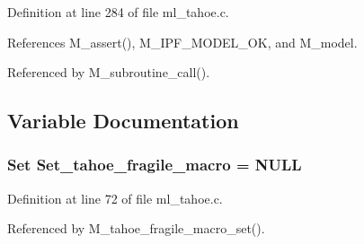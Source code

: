 Definition at line 284 of file ml\_\-tahoe.c.

References M\_\-assert(), M\_\-IPF\_\-MODEL\_\-OK, and M\_\-model.

Referenced by M\_\-subroutine\_\-call().

\subsection{Variable Documentation}
\subsubsection{\setlength{\rightskip}{0pt plus 5cm}\bf{Set} \bf{Set\_\-tahoe\_\-fragile\_\-macro} = \bf{NULL}}\label{ml__tahoe_8c_abb3f68c5c48b91210f97e7b7204b03d}




Definition at line 72 of file ml\_\-tahoe.c.

Referenced by M\_\-tahoe\_\-fragile\_\-macro\_\-set().